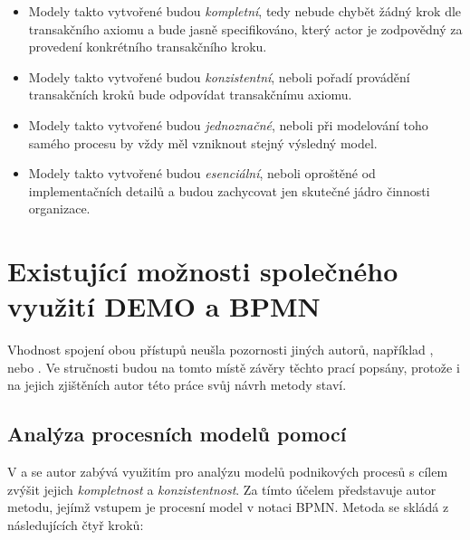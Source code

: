 \begin{itemize}
\item Modely takto vytvořené budou \textit{kompletní}, tedy nebude chybět žádný krok dle transakčního axiomu a bude jasně specifikováno, který actor je zodpovědný za provedení konkrétního transakčního kroku.
\item Modely takto vytvořené budou \textit{konzistentní}, neboli pořadí provádění transakčních kroků bude odpovídat transakčnímu axiomu.
\item Modely takto vytvořené budou \textit{jednoznačné}, neboli při modelování toho samého procesu by vždy měl vzniknout stejný výsledný model.
\item Modely takto vytvořené budou \textit{esenciální}, neboli oproštěné od implementačních detailů a budou zachycovat jen skutečné jádro činnosti organizace.
\end{itemize}



\section{Existující možnosti společného využití DEMO a BPMN} \label{sec:existujici_moznosti}
Vhodnost spojení obou přístupů neušla pozornosti jiných autorů, například \cite{VanNuffel2009}, \cite{Caetano2011} nebo \cite{Caetano2012}. Ve stručnosti budou na tomto místě závěry těchto prací popsány, protože i na jejich zjištěních autor této práce svůj návrh metody staví.

\subsection{Analýza procesních modelů pomocí \ptheory{}} \label{sec:analyza_proc_modelu_psi}
V \cite{Caetano2012} a \cite{Caetano2011} se autor zabývá využitím \ptheory{} pro analýzu modelů podnikových procesů s cílem zvýšit jejich \textit{kompletnost} a \textit{konzistentnost}. Za tímto účelem představuje autor metodu, jejímž vstupem je procesní model v notaci BPMN. Metoda se skládá z následujících čtyř kroků:

